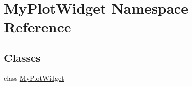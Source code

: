 \hypertarget{namespace_my_plot_widget}{\section{My\-Plot\-Widget Namespace Reference}
\label{namespace_my_plot_widget}
}
\subsection*{Classes}
\begin{DoxyCompactItemize}
\item 
class \hyperlink{class_my_plot_widget_1_1_my_plot_widget}{My\-Plot\-Widget}
\end{DoxyCompactItemize}

